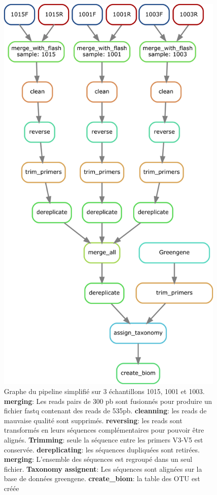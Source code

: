 \documentclass[12pt,a4paper]{article}
\begin{document}
\begin{figure}[!ht]
\begin{center}
\includegraphics[scale=0.5]{img/pipeline_trio.png}\hfill
\end{center}
\caption{Graphe du pipeline simplifié sur 3 échantillons 1015, 1001 et 1003.\\ \textbf{merging}: Les reads pairs de 300 pb sont fusionnés  pour produire un fichier fastq contenant des reads de 535pb. \textbf{cleanning}: les reads de mauvaise qualité sont supprimés. \textbf{reversing}: les reads sont transformés en leurs séquences complémentaires pour pouvoir être alignés. \textbf{Trimming}: seule la séquence entre les primers V3-V5 est conservée. \textbf{dereplicating}: les séquences dupliquées sont retirées. \textbf{merging}: L'ensemble des séquences est regroupé dans un seul fichier. \textbf{Taxonomy assignent}: Les séquences sont alignées sur la base de données greengene. \textbf{create\_biom}: la table des OTU est créée }
\label{pipeline_trio}
\end{figure}
\end{document}
